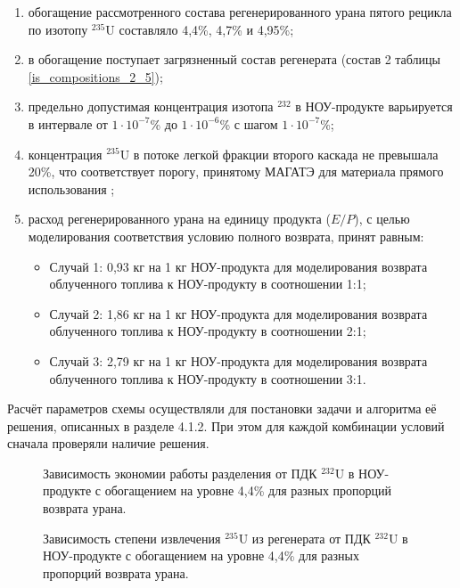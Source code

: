 \begin{enumerate}
    \item обогащение рассмотренного состава регенерированного урана пятого рецикла по изотопу $^{235}$U составляло 4,4\%, 4,7\% и 4,95\%;
    \item в обогащение поступает загрязненный состав регенерата (состав 2 таблицы \ref{is_compositions_2_5});    
    \item предельно допустимая концентрация изотопа $^{232}$ в НОУ-продукте варьируется в интервале от $1\cdot10^{-7}$\% до $1\cdot10^{-6}$\% с шагом $1\cdot10^{-7}$\%;
    \item концентрация $^{235}$U в потоке легкой фракции второго каскада не превышала 20\%, что соответствует порогу, принятому МАГАТЭ для материала прямого использования \cite{alekseevConceptUseRecycled2010};
    \item расход регенерированного урана на единицу продукта ($E/P$), с целью моделирования соответствия условию полного возврата, принят равным:
    \begin{itemize}
        \item Случай 1: 0,93 кг на 1 кг НОУ-продукта для моделирования возврата облученного топлива к НОУ-продукту в соотношении 1:1;
        \item Случай 2: 1,86 кг на 1 кг НОУ-продукта для моделирования возврата облученного топлива к НОУ-продукту в соотношении 2:1;
        \item Случай 3: 2,79 кг на 1 кг НОУ-продукта для моделирования возврата облученного топлива к НОУ-продукту в соотношении 3:1.
    \end{itemize}
\end{enumerate}

Расчёт параметров схемы осуществляли для постановки задачи и алгоритма её решения, описанных в разделе 4.1.2. При этом для каждой комбинации условий сначала проверяли наличие решения.


\begin{figure}
    \centering
    \begin{minipage}{.5\textwidth}
      \centering
      
      \caption{{Зависимость экономии работы разделения от ПДК $^{232}$U в НОУ-продукте с обогащением на уровне 4,4\% для разных пропорций возврата урана.{\label{sw44}}}}
    \end{minipage}%
    \begin{minipage}{.5\textwidth}
      \centering
      
      \caption{{Зависимость степени извлечения $^{235}$U из регенерата от ПДК $^{232}$U в НОУ-продукте с обогащением на уровне 4,4\% для разных пропорций возврата урана.{\label{exR44}}}}
    \end{minipage}
\end{figure}



